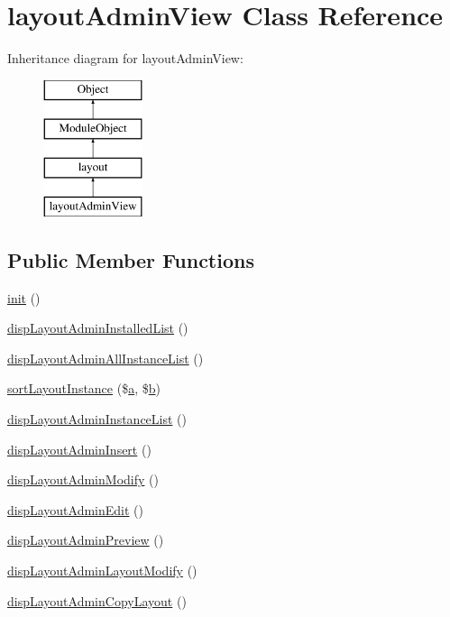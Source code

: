 \hypertarget{classlayoutAdminView}{}\section{layout\+Admin\+View Class Reference}
\label{classlayoutAdminView}
Inheritance diagram for layout\+Admin\+View\+:\begin{figure}[H]
\begin{center}
\leavevmode
\includegraphics[height=4.000000cm]{classlayoutAdminView}
\end{center}
\end{figure}
\subsection*{Public Member Functions}
\begin{DoxyCompactItemize}
\item 
\hyperlink{classlayoutAdminView_a572826e03a68707b409298b63d438d5a}{init} ()
\item 
\hyperlink{classlayoutAdminView_acad8194900695a9aa48ff6dca1435dd3}{disp\+Layout\+Admin\+Installed\+List} ()
\item 
\hyperlink{classlayoutAdminView_a278b148cb2673f86c08fe932b1db38e8}{disp\+Layout\+Admin\+All\+Instance\+List} ()
\item 
\hyperlink{classlayoutAdminView_ae962bf1da94055c92d4fbb6a1bc66458}{sort\+Layout\+Instance} (\$\hyperlink{jqplot_8barRenderer_8min_8js_a15f14caa0c9de3a415d8eb9d88378fc0}{a}, \$\hyperlink{jqplot_8barRenderer_8min_8js_a2fc619a5cd76c0e5c2bd9f57a6fcbd3e}{b})
\item 
\hyperlink{classlayoutAdminView_ab392ea5f53d762ac9da15fe6d40c1e6b}{disp\+Layout\+Admin\+Instance\+List} ()
\item 
\hyperlink{classlayoutAdminView_a8b9a9218b2de78d6a0578471852310b0}{disp\+Layout\+Admin\+Insert} ()
\item 
\hyperlink{classlayoutAdminView_a96a02667575c453953a50cc279443785}{disp\+Layout\+Admin\+Modify} ()
\item 
\hyperlink{classlayoutAdminView_a21250397a3190ca81f64d8ad9af3fff8}{disp\+Layout\+Admin\+Edit} ()
\item 
\hyperlink{classlayoutAdminView_a0c3520a579bb0bbdf1975273c3c6036c}{disp\+Layout\+Admin\+Preview} ()
\item 
\hyperlink{classlayoutAdminView_a1be4548859d4f3a913b33c4e8b395f51}{disp\+Layout\+Admin\+Layout\+Modify} ()
\item 
\hyperlink{classlayoutAdminView_a48e095b862b7cb1482e94fec3c7624cc}{disp\+Layout\+Admin\+Copy\+Layout} ()
\end{DoxyCompactItemize}
